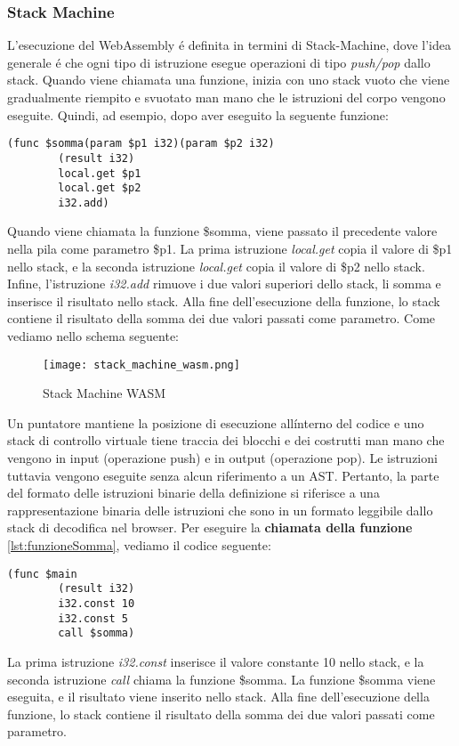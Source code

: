 \documentclass[../../main.tex]{subfiles}
\begin{document}
\subsubsection{Stack Machine}
L'esecuzione del WebAssembly é definita in termini di Stack-Machine, dove l'idea generale é che ogni tipo di istruzione esegue operazioni di tipo \textit{push/pop} dallo stack.
Quando viene chiamata una funzione, inizia con uno stack vuoto che viene gradualmente riempito e svuotato man mano che le istruzioni del corpo vengono eseguite. Quindi, ad esempio, dopo aver eseguito la seguente funzione:
\begin{lstlisting}[language=WebAssembly, label={lst:funzioneSomma}]
    (func $somma(param $p1 i32)(param $p2 i32)
        (result i32)
        local.get $p1
        local.get $p2
        i32.add)
\end{lstlisting}
Quando viene chiamata la funzione \$somma, viene passato il precedente valore nella pila come parametro \$p1. La prima istruzione \textit{local.get} copia il valore di \$p1 nello stack, e la seconda istruzione \textit{local.get} copia il valore di \$p2 nello stack. Infine, l'istruzione \textit{i32.add} rimuove i due valori superiori dello stack, li somma e inserisce il risultato nello stack. Alla fine dell'esecuzione della funzione, lo stack contiene il risultato della somma dei due valori passati come parametro.
Come vediamo nello schema seguente:
\begin{figure}[H]
    \centering
    \texttt{[image: stack\_machine\_wasm.png]}
    \caption{Stack Machine WASM}
    \label{fig:stack_machine}
\end{figure}
Un puntatore mantiene la posizione di esecuzione all\' interno del codice e uno stack di controllo virtuale tiene traccia dei blocchi e dei costrutti man mano che vengono in input (operazione push) e in output (operazione pop). Le istruzioni tuttavia vengono eseguite senza alcun riferimento a un AST. Pertanto, la parte del formato delle istruzioni binarie della definizione si riferisce a una rappresentazione binaria delle istruzioni che sono in un formato leggibile dallo stack di decodifica nel browser.\autocite{amslaurea20464}
Per eseguire la \textbf{chiamata della funzione} \ref{lst:funzioneSomma}, vediamo il codice seguente:
\begin{lstlisting}[language=WebAssembly]
    (func $main
        (result i32)
        i32.const 10
        i32.const 5
        call $somma)
\end{lstlisting}
La prima istruzione \textit{i32.const} inserisce il valore constante 10 nello stack, e la seconda istruzione \textit{call} chiama la funzione \$somma. La funzione \$somma viene eseguita, e il risultato viene inserito nello stack. Alla fine dell'esecuzione della funzione, lo stack contiene il risultato della somma dei due valori passati come parametro.
\end{document}
